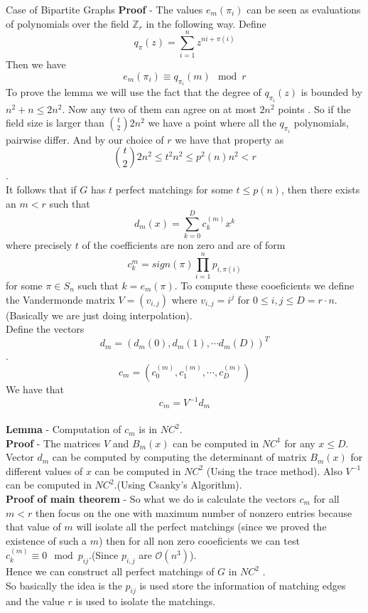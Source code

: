 \documentclass{beamer}
\begin{document}
\begin{frame}[allowframebreaks]{Case of Bipartite Graphs}
		\textbf{Proof} - The values $e_m(\pi_i)$ can be seen as evaluations of polynomials over the field $\mathbb{Z}_r$ in the following way. Define $$q_{\pi}(z)= \sum_{i=1}^{n}z^{ni+\pi(i)}$$
		Then we have $$e_m(\pi_i)\equiv q_{\pi_i}(m) \mod r$$
		To prove the lemma we will use the fact that the degree of $q_{\pi_i}(z)$ is bounded by $n^2+n\leq 2n^2$. Now any two of them can agree on at most $2n^2$ points . So if the field size is larger than ${t\choose 2} 2n^2$ we have a point where all the $q_{\pi_i}$ polynomials, pairwise differ. And by our choice of $r$ we have that property as 
		$${t\choose 2 } 2n^2 \leq t^2n^2\leq p^2(n)n^2<r$$.
		\\
		It follows that if $G$ has $t$ perfect matchings for some $t\leq p(n)$, then there exists an $m<r$ such that $$d_{m}(x)=\sum_{k=0}^{D}c_{k}^{(m)} x^k$$
		where precisely $t$ of the coefficients are non zero and are of form $$c_{k}^{m}=sign(\pi)\prod_{i=1}^{n} p_{i,\pi(i)}$$
		for some $\pi \in S_n$ such that $k=e_m(\pi)$. To compute these cooeficients we define the Vandermonde matrix $V=(v_{i,j})$ where $v_{i,j}=i^j$ for $0\leq i,j \leq D=r\cdot n$.(Basically we are just doing interpolation).
		\\
		Define the vectors $$d_m=(d_m(0),d_m(1),\cdots d_m(D))^T$$.
		$$c_m=(c_{0}^{(m)},c_{1}^{(m)}, \cdots, c_{D}^{(m)})$$
		We have that $$c_m=V^{-1} d_m$$\\
		\textbf{Lemma} - Computation of $c_m$ is in $NC^2$.
		\\ \textbf{Proof} - The matrices $V$ and $B_m(x)$ can be computed in $NC^1$ for any $x \leq D$. Vector $d_m$ can be computed by computing the determinant of matrix $B_{m}(x)$ for different values of $x$ can be computed in $NC^2$ (Using the trace method). Also $V^{-1}$ can be computed in $NC^2$.(Using Csanky's Algorithm).\\
		\textbf{Proof of main theorem} - So what we do is calculate the vectors $c_m$ for all $m<r$ then focus on the one with maximum number of nonzero entries because that value of $m$ will isolate all the perfect matchings (since we proved the existence of such a $m$) then for all non zero cooeficients we can test $c_{k}^{(m)} \equiv 0 \mod p_{ij}$.(Since $p_{i,j}$ are $\mathcal{O}(n^3)$). 
		\\Hence we can construct all perfect matchings of $G$ in $NC^2$ .
		\\So basically the idea is the $p_{ij}$ is used store the information of matching edges and the value $r$ is used to isolate the matchings.
		
		
\end{frame}
\end{document}
